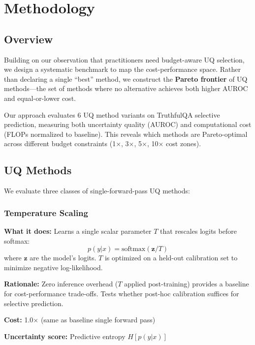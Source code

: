 \section{Methodology}

\subsection{Overview}

Building on our observation that practitioners need budget-aware UQ selection, we design a systematic benchmark to map the cost-performance space. Rather than declaring a single ``best'' method, we construct the \textbf{Pareto frontier} of UQ methods---the set of methods where no alternative achieves both higher AUROC and equal-or-lower cost.

Our approach evaluates 6 UQ method variants on TruthfulQA selective prediction, measuring both uncertainty quality (AUROC) and computational cost (FLOPs normalized to baseline). This reveals which methods are Pareto-optimal across different budget constraints (1$\times$, 3$\times$, 5$\times$, 10$\times$ cost zones).

\subsection{UQ Methods}

We evaluate three classes of single-forward-pass UQ methods:

\subsubsection{Temperature Scaling}

\textbf{What it does:} Learns a single scalar parameter $T$ that rescales logits before softmax:
\begin{equation}
p(y|x) = \text{softmax}(\mathbf{z}/T)
\end{equation}
where $\mathbf{z}$ are the model's logits. $T$ is optimized on a held-out calibration set to minimize negative log-likelihood.

\textbf{Rationale:} Zero inference overhead ($T$ applied post-training) provides a baseline for cost-performance trade-offs. Tests whether post-hoc calibration suffices for selective prediction.

\textbf{Cost:} 1.0$\times$ (same as baseline single forward pass)

\textbf{Uncertainty score:} Predictive entropy $H[p(y|x)]$

